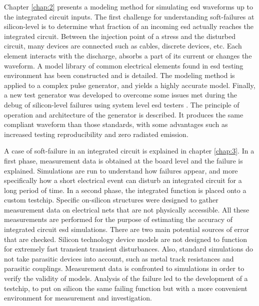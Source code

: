 %
Chapter \ref{chap:2} presents a modeling method for simulating \gls{esd} waveforms up to the integrated circuit inputs.
The first challenge for understanding soft-failures at silicon-level is to determine what fraction of an incoming \gls{esd} actually reaches the integrated circuit.
Between the injection point of a stress and the disturbed circuit, many devices are connected such as cables, discrete devices, etc.
Each element interacts with the discharge, absorbs a part of its current or changes the waveform.
A model library of common electrical elements found in \gls{esd} testing environment has been constructed and is detailed.
The modeling method is applied to a complex pulse generator, and yields a highly accurate model.
Finally, a new test generator was developed to overcome some issues met during the debug of silicon-level failures using system level \gls{esd} testers \cite{iec61000-4-2, iso10605}.
The principle of operation and architecture of the generator is described.
It produces the same compliant waveform than those standards, with some advantages such as increased testing reproducibility and zero radiated emission.

%
A case of soft-failure in an integrated circuit is explained in chapter \ref{chap:3}.
In a first phase, measurement data is obtained at the board level and the failure is explained.
Simulations are run to understand how failures appear, and more specifically how a short electrical event can disturb an integrated circuit for a long period of time.
In a second phase, the integrated function is placed onto a custom testchip.
Specific on-silicon structures were designed to gather measurement data on electrical nets that are not physically accessible.
All these measurements are performed for the purpose of estimating the accuracy of integrated circuit \gls{esd} simulations.
There are two main potential sources of error that are checked.
Silicon technology device models are not designed to function for extremely fast transient transient disturbances.
Also, standard simulations do not take parasitic devices into account, such as metal track resistances and parasitic couplings.
Measurement data is confronted to simulations in order to verify the validity of models.
Analysis of the failure led to the development of a testchip, to put on silicon the same failing function but with a more convenient environment for measurement and investigation.

